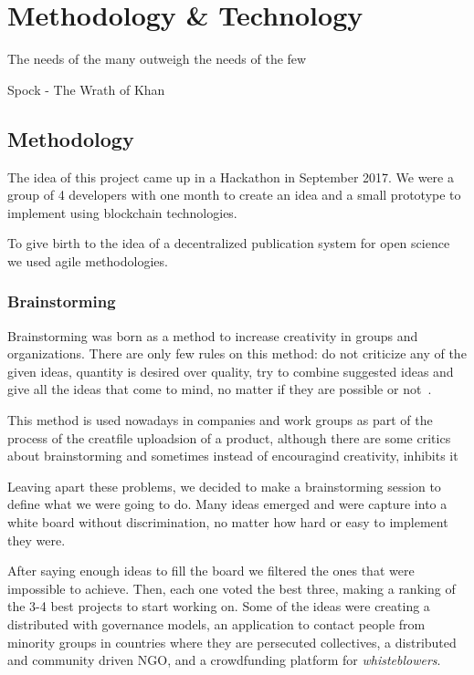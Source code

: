 \chapter{Methodology \& Technology}

\begin{FraseCelebre}
  \begin{Frase}
    The needs of the many outweigh the needs of the few
  \end{Frase}
  \begin{Fuente}
    Spock - The Wrath of Khan
  \end{Fuente}
\end{FraseCelebre}

\section{Methodology}
The idea of this project came up in a Hackathon in September 2017. We were a
group of 4 developers with one month to create an idea and a small prototype to
implement using blockchain technologies.

To give birth to the idea of a decentralized publication system for open science
we used agile methodologies.


\subsection{Brainstorming}

Brainstorming was born as a method to increase creativity in groups and
organizations. There are only few rules on this method: do not criticize any of
the given ideas, quantity is desired over quality, try to combine suggested
ideas and give all the ideas that come to mind, no matter if they are possible
or not~\cite{osborn1953applied}.

This method is used nowadays in companies and work groups as part of the process
of the creatfile uploadsion of a product, although there are some critics about
brainstorming and sometimes instead of encouragind creativity, inhibits
it~\cite{sutton1996brainstorming,mullen1991productivity}

Leaving apart these problems, we decided to make a brainstorming session to
define what we were going to do. Many ideas emerged and were capture into a
white board without discrimination, no matter how hard or easy to implement they
were.

After saying enough ideas to fill the board we filtered the ones that were
impossible to achieve. Then, each one voted the best three, making a ranking of
the 3-4 best projects to start working on. Some of the ideas were creating a
distributed  with governance models, an application to contact
people from minority groups in countries where they are persecuted collectives,
a distributed and community driven NGO, and a crowdfunding platform for
\emph{whisteblowers}.

